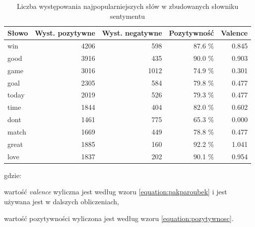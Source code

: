 \begin{table}[ht!]  
\begin{center}  
\begin{tabular}{|l|r|r|r|r|}
\hline
Słowo & Wyst. pozytywne  & Wyst. negatywne 
& Pozytywność
& Valence
\\ \hline 
win & 4206 & 598 & 87.6 \% & 0.845 \\ \hline
good & 3916 & 435 & 90.0 \% & 0.903 \\ \hline
game & 3016 & 1012 & 74.9 \% & 0.301 \\ \hline
goal & 2305 & 584 & 79.8 \% & 0.477 \\ \hline
today & 2019 & 526 & 79.3 \% & 0.477 \\ \hline
time & 1844 & 404 & 82.0 \% & 0.602 \\ \hline
dont & 1461 & 775 & 65.3 \% & 0.000 \\ \hline
match & 1669 & 449 & 78.8 \% & 0.477 \\ \hline
great & 1885 & 160 & 92.2 \% & 1.041 \\ \hline
love & 1837 & 202 & 90.1 \% & 0.954 \\ \hline
\end{tabular} 
\end{center} 
\caption{Liczba występowania najpopularniejszych słów w zbudowanych słowniku
sentymentu}
\label{tab:liczebnosc-slow-sentymentu}
\end{table}

gdzie:

wartość \textit{valence} wyliczna jest według wzoru \ref{equation:pakparoubek} 
i jest używana jest w dalszych obliczeniach,

wartość pozytywności wyliczona jest według wzoru \ref{equation:pozytywnosc}.

\bigskip


